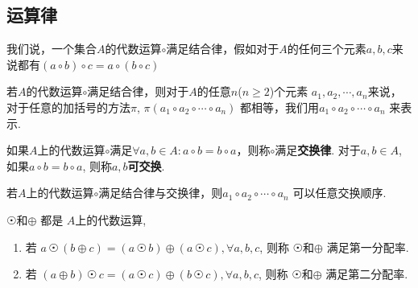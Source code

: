 \subsection{运算律} %

\begin{Definition}[结合率]
我们说，一个集合$A$的代数运算$\circ$满足结合律，假如对于$A$的任何三个元素$a, b, c$来说都有$
(a \circ b) \circ c = a \circ (b \circ c)
$
\end{Definition}


\begin{Theorem}
若$A$的代数运算$\circ$满足结合律，则对于$A$的任意$n$($n \ge 2$)个元素 $a_1, a_2, \cdots, a_n$来说，对于任意的加括号的方法$\pi$, $\pi(a_1 \circ a_2 \circ \cdots \circ a_n)$ 都相等，我们用$a_1 \circ a_2 \circ \cdots \circ a_n$ 来表示.
\end{Theorem}

\begin{Definition}[交换律]
如果$A$上的代数运算$\circ$满足$\forall a, b \in A: a \circ b = b \circ a$，则称$\circ$满足\textbf{交换律}. 对于$a, b \in A$, 如果$a \circ b = b \circ a$, 则称$a, b$\textbf{可交换}.
\end{Definition}

\begin{Theorem}
若$A$上的代数运算$\circ$满足结合律与交换律，则$a_1 \circ a_2 \circ \cdots \circ a_n$ 可以任意交换顺序.
\end{Theorem}

\begin{Definition}[分配率]
$ \astrosun $和$ \oplus $ 都是 $A$上的代数运算, 
\begin{enumerate}[(1)]
\item 若
$ a \, \astrosun \, (b \oplus c) = (a \, \astrosun \, b) \oplus (a \, \astrosun \, c), \forall a, b, c $, 则称 $ \astrosun$和$ \oplus $  满足第一分配率.
\item 若
$ (a \oplus b) \, \astrosun \, c = (a \, \astrosun \, c) \oplus ( b \, \astrosun \, c), \forall a, b, c$, 则称 $ \astrosun$和$\oplus $  满足第二分配率.
\end{enumerate}
\end{Definition}

